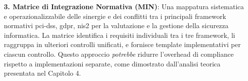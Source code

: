 \textbf{3. Matrice di Integrazione Normativa (MIN)}: Una mappatura sistematica e operazionalizzabile delle sinergie e dei conflitti tra i principali framework normativi \gls{pci-dss}, \gls{gdpr}, \gls{nis2} per la valutazione e la gestione della sicurezza informatica. La matrice identifica i requisiti individuali tra i tre framework, li raggruppa in ulteriori controlli unificati, e fornisce template implementativi per ciascun controllo. Questo approccio \textit{potrebbe} ridurre l'overhead di compliance 
rispetto a implementazioni separate, come dimostrato dall'analisi 
teorica presentata nel Capitolo 4.




